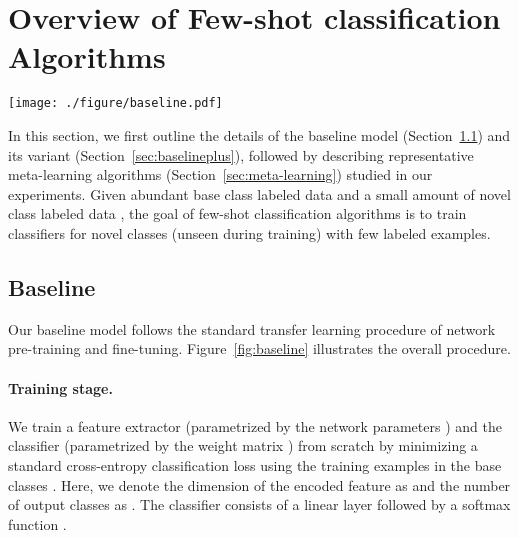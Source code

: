 \documentclass{article}
\newlength\paramargin
\newlength\secmargin
\newcommand{\secref}[1]{Section~\ref{sec:#1}}
\newcommand{\figref}[1]{Figure~\ref{fig:#1}}
\begin{document}
 \vspace{\secmargin}
\section{Overview of Few-shot classification Algorithms}
\label{sec:method}
\begin{figure*}[t!]
\texttt{[image: ./figure/baseline.pdf]}
\caption{\textbf{Baseline and Baseline++ few-shot classification methods.} Both the baseline and baseline++ method train a feature extractor  and classifier  with base class data in the training stage
In the fine-tuning stage, we fix the network parameters  in the feature extractor  and train a new classifier  with the given labeled examples in novel classes. The baseline++ method differs from the baseline model in the use of cosine distances between the input feature and the weight vector for each class that aims to reduce intra-class variations.
}
\label{fig:baseline}
\end{figure*}
 
In this section, we first outline the details of the baseline model (\secref{baseline}) and its variant (\secref{baselineplus}), followed by describing representative meta-learning algorithms (\secref{meta-learning}) studied in our experiments.
Given abundant base class labeled data  and a small amount of novel class labeled data , the goal of few-shot classification algorithms is to train classifiers for novel classes (unseen during training) with few labeled examples.


\vspace{\secmargin}
\subsection{Baseline}
\label{sec:baseline}
Our baseline model follows the standard transfer learning procedure of network pre-training and fine-tuning. \figref{baseline} illustrates the overall procedure.
\vspace{\paramargin}
\paragraph{Training stage.} We train a feature extractor  (parametrized by the network parameters ) and the classifier  (parametrized by the weight matrix ) from scratch by minimizing a standard cross-entropy classification loss  using the training examples in the base classes . Here, we denote the dimension of the encoded feature as  and the number of output classes as . The classifier  consists of a linear layer  followed by a softmax function .
\end{document}
